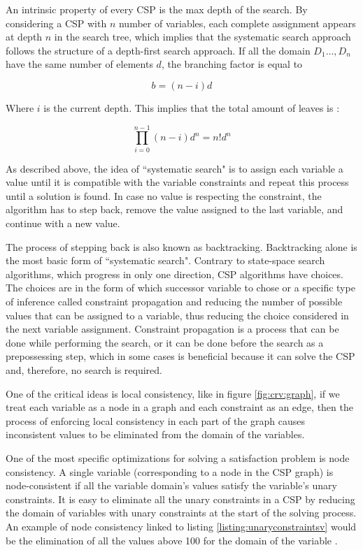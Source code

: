 An intrinsic property of every CSP is the max depth of the search. By
considering a CSP with $n$ number of variables, each complete assignment appears
at depth $n$ in the search tree, which implies that the systematic search
approach follows the structure of a depth-first search approach. If all the
domain $D_1 \dots, D_n$ have the same number of elements $d$, the branching
factor is equal to

\begin{equation}
b = (n - i) d
\end{equation}

Where $i$ is the current depth. This implies that the total amount of leaves is
\cite{Chowdhary2020}:

\begin{equation}
    \prod_{i=0}^{n-1}(n-i)d^n = n ! d^n
\end{equation}

As described above, the idea of ``systematic search" is to assign each variable
a value until it is compatible with the variable constraints and repeat this
process until a solution is found. In case no value is respecting the
constraint, the algorithm has to step back, remove the value assigned to the
last variable, and continue with a new value.

The process of stepping back is also known as backtracking. Backtracking alone
is the most basic form of ``systematic search". Contrary to state-space search
algorithms, which progress in only one direction, CSP algorithms have choices.
The choices are in the form of which successor variable to chose or a specific
type of inference called constraint propagation \cite{russell2002artificial} and
reducing the number of possible values that can be assigned to a variable, thus
reducing the choice considered in the next variable assignment. Constraint
propagation is a process that can be done while performing the search, or it can
be done before the search as a prepossessing step, which in some cases is
beneficial because it can solve the CSP and, therefore, no search is required.

One of the critical ideas is local consistency, like in figure
\ref{fig:crv:graph}, if we treat each variable as a node in a graph and each
constraint as an edge, then the process of enforcing local consistency in each
part of the graph causes inconsistent values to be eliminated from the domain of
the variables.

One of the most specific optimizations for solving a satisfaction problem is
node consistency. A single variable (corresponding to a node in the CSP graph)
is node-consistent if all the variable domain's values satisfy the variable's
unary constraints. It is easy to eliminate all the unary constraints in a CSP by
reducing the domain of variables with unary constraints at the start of the
solving process. An example of node consistency linked to listing
\ref{listing:unaryconstraintsv} would be the elimination of all the values above
100 for the domain of the variable .


